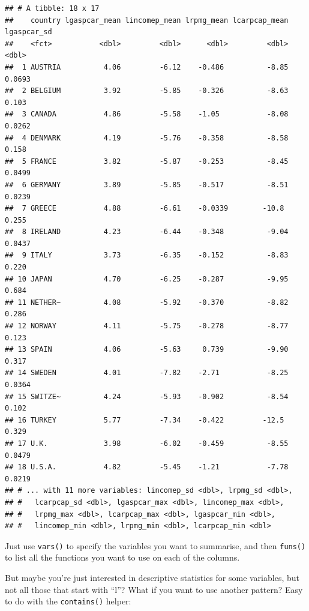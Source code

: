 \documentclass[]{gitbook}
\newenvironment{Shaded}{\begin{snugshade}}{\end{snugshade}}
\newcommand{\KeywordTok}[1]{\textcolor[rgb]{0.13,0.29,0.53}{\textbf{#1}}}
\newcommand{\NormalTok}[1]{#1}
\newcommand{\OperatorTok}[1]{\textcolor[rgb]{0.81,0.36,0.00}{\textbf{#1}}}
\newcommand{\StringTok}[1]{\textcolor[rgb]{0.31,0.60,0.02}{#1}}
\theoremstyle{definition}
\theoremstyle{definition}
\theoremstyle{definition}
\theoremstyle{remark}
\begin{document}
\begin{verbatim}
## # A tibble: 18 x 17
##    country lgaspcar_mean lincomep_mean lrpmg_mean lcarpcap_mean lgaspcar_sd
##    <fct>           <dbl>         <dbl>      <dbl>         <dbl>       <dbl>
##  1 AUSTRIA          4.06         -6.12    -0.486          -8.85      0.0693
##  2 BELGIUM          3.92         -5.85    -0.326          -8.63      0.103 
##  3 CANADA           4.86         -5.58    -1.05           -8.08      0.0262
##  4 DENMARK          4.19         -5.76    -0.358          -8.58      0.158 
##  5 FRANCE           3.82         -5.87    -0.253          -8.45      0.0499
##  6 GERMANY          3.89         -5.85    -0.517          -8.51      0.0239
##  7 GREECE           4.88         -6.61    -0.0339        -10.8       0.255 
##  8 IRELAND          4.23         -6.44    -0.348          -9.04      0.0437
##  9 ITALY            3.73         -6.35    -0.152          -8.83      0.220 
## 10 JAPAN            4.70         -6.25    -0.287          -9.95      0.684 
## 11 NETHER~          4.08         -5.92    -0.370          -8.82      0.286 
## 12 NORWAY           4.11         -5.75    -0.278          -8.77      0.123 
## 13 SPAIN            4.06         -5.63     0.739          -9.90      0.317 
## 14 SWEDEN           4.01         -7.82    -2.71           -8.25      0.0364
## 15 SWITZE~          4.24         -5.93    -0.902          -8.54      0.102 
## 16 TURKEY           5.77         -7.34    -0.422         -12.5       0.329 
## 17 U.K.             3.98         -6.02    -0.459          -8.55      0.0479
## 18 U.S.A.           4.82         -5.45    -1.21           -7.78      0.0219
## # ... with 11 more variables: lincomep_sd <dbl>, lrpmg_sd <dbl>,
## #   lcarpcap_sd <dbl>, lgaspcar_max <dbl>, lincomep_max <dbl>,
## #   lrpmg_max <dbl>, lcarpcap_max <dbl>, lgaspcar_min <dbl>,
## #   lincomep_min <dbl>, lrpmg_min <dbl>, lcarpcap_min <dbl>
\end{verbatim}

Just use \texttt{vars()} to specify the variables you want to summarise,
and then \texttt{funs()} to list all the functions you want to use on
each of the columns.

But maybe you're just interested in descriptive statistics for some
variables, but not all those that start with ``l''? What if you want to
use another pattern? Easy to do with the \texttt{contains()} helper:

\begin{Shaded}
\end{Shaded}
\end{document}
